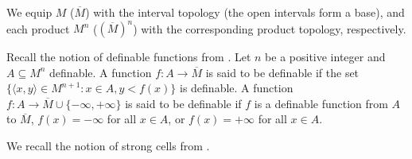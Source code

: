 \documentclass{amsart}
\theoremstyle{definition}
\theoremstyle{plain}
\newcommand{\ov}[1]{\overline{#1}}
\begin{document}
We equip $M$ ($\ov{M}$) with the interval topology
(the open intervals form a base),
and each product $M^n$ ($(\ov{M})^n$) with 
the corresponding product topology, respectively.


Recall the notion of definable functions from \cite{W2}.
Let $n$ be a positive integer and $A \subseteq M^n$ definable.
A function $f : A \to \ov{M}$ is said to be definable
if the set 
$\{ \langle x, y \rangle \in M^{n+1} : 
x \in A, y < f(x) \}$ is definable.
A function $f : A \to \ov{M} \cup \{-\infty, +\infty\}$ 
is said to be definable
if $f$ is a definable function from $A$ to $\ov{M}$,
$f(x) = -\infty$ for all $x \in A$, or $f(x) = +\infty$ 
for all $x \in A$.


We recall the notion of strong cells from \cite{W1}.
\end{document}
